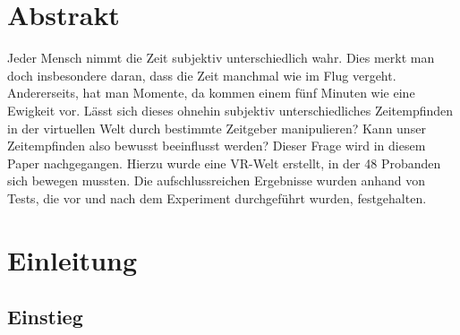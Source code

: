 \documentclass{Paper}
\begin{document}
\maketitle


\tableofcontents
\clearpage
	
\section{Abstrakt}
	Jeder Mensch nimmt die Zeit subjektiv unterschiedlich wahr. Dies merkt man doch insbesondere daran, dass die Zeit manchmal wie im Flug vergeht. Andererseits, hat man Momente, da kommen einem fünf Minuten wie eine Ewigkeit vor. Lässt sich dieses ohnehin subjektiv unterschiedliches Zeitempfinden in der virtuellen Welt durch bestimmte Zeitgeber manipulieren? Kann unser Zeitempfinden also bewusst beeinflusst werden?  Dieser Frage wird in diesem Paper nachgegangen. Hierzu wurde eine VR-Welt erstellt, in der 48 Probanden sich bewegen mussten. Die aufschlussreichen Ergebnisse wurden anhand von Tests, die vor und nach dem Experiment durchgeführt wurden, festgehalten. 
	

\section{Einleitung}
\subsection{Einstieg}
\end{document}
